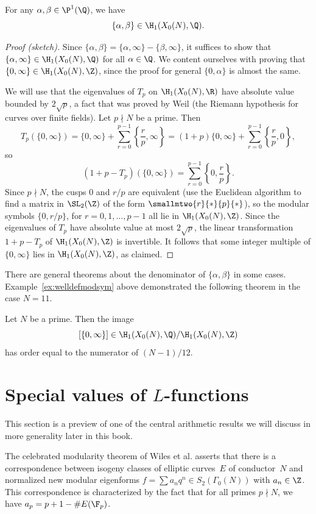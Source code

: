 \documentclass{report}
\begin{document}
\begin{theorem}[Manin]\label{thm:maninrat}
For any $\alpha,\beta\in\P^1(\Q)$, we have
\[\{\alpha,\beta\}\in\H_1(X_0(N),\Q).\]
\end{theorem}
\begin{proof}[Proof (sketch)]
Since $\{\alpha,\beta\} = \{\alpha,\infty\}-\{\beta,\infty\}$, it
suffices to show that $\{\alpha,\infty\}\in\H_1(X_0(N),\Q)$ for
all $\alpha\in\Q$. We content ourselves with proving that
$\{0,\infty\}\in\H_1(X_0(N),\Z)$, since the proof for general
$\{0,\alpha\}$ is almost the same.

We will use that the eigenvalues of $T_p$ on $\H_1(X_0(N),\R)$
have absolute value bounded by $2\sqrt{p}$, a fact that was proved
by Weil (the Riemann hypothesis for curves over finite fields).
Let $p\nmid N$ be a prime. Then
\[
  T_p(\{0,\infty\}) = \{0,\infty\} + \sum_{r=0}^{p-1} \left\{\frac{r}{p},\infty\right\}
    = (1+p)\{0,\infty\} + \sum_{r=0}^{p-1} \left\{\frac{r}{p},0\right\},
\]
so
\[
  (1+p-T_p)(\{0,\infty\}) = \sum_{r=0}^{p-1} \left\{ 0, \frac{r}{p}\right\}.
\]
Since $p\nmid N$, the cusps $0$ and $r/p$ are equivalent (use the Euclidean
algorithm to find a matrix in $\SL_2(\Z)$ of the form $\smallmtwo{r}{*}{p}{*}$), so
the modular symbols $\{0,r/p\}$, for $r=0,1,\ldots,p-1$ all lie in $\H_1(X_0(N),\Z)$.
Since the eigenvalues of $T_p$ have absolute value at most $2\sqrt{p}$, the
linear transformation $1+p-T_p$ of $\H_1(X_0(N),\Z)$ is invertible.
It follows that some integer multiple of $\{0,\infty\}$ lies
in $\H_1(X_0(N),\Z)$, as claimed.
\end{proof}


There are general theorems about the denominator of
$\{\alpha,\beta\}$ in some cases.  Example~\ref{ex:welldefmodsym}
above demonstrated the following theorem in the case $N=11$.
\begin{theorem}
Let $N$ be a prime.  Then the image
$$[\{0,\infty\}] \in \H_1(X_0(N),\Q)/\H_1(X_0(N),\Z)$$ has order equal to the
numerator of $(N-1)/12$.
\end{theorem}

\section{Special values of $L$-functions}
This section is a preview of one of the central arithmetic results we
will discuss in more generality later in this book.

The celebrated modularity theorem of Wiles et al. asserts that
there is a correspondence between isogeny classes of elliptic
curves~$E$ of conductor~$N$ and normalized new modular eigenforms
$f=\sum a_n q^n\in S_2(\Gamma_0(N))$ with $a_n\in\Z$. This
correspondence is characterized by the fact that for all primes
$p\nmid N$, we have $a_p = p+1-\#E(\F_p)$.
\end{document}
